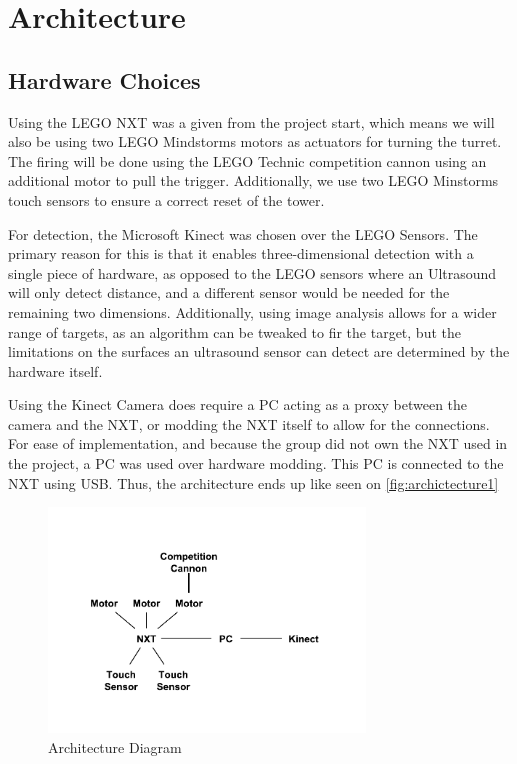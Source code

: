 \section{Architecture}

\subsection{Hardware Choices}

Using the LEGO NXT was a given from the project start, which means we will also be using two LEGO Mindstorms
motors as actuators for turning the turret. The firing will be done using the LEGO Technic competition cannon
using an additional motor to pull the trigger. Additionally, we use two LEGO Minstorms touch sensors to ensure
a correct reset of the tower.

For detection, the Microsoft Kinect was chosen over the LEGO Sensors. The primary reason for this is that
it enables three-dimensional detection with a single piece of hardware, as opposed to the LEGO sensors where
an Ultrasound will only detect distance, and a different sensor would be needed for the remaining two dimensions.
Additionally, using image analysis allows for a wider range of targets, as an algorithm can be tweaked to
fir the target, but the limitations on the surfaces an ultrasound sensor can detect are determined by the
hardware itself.

Using the Kinect Camera does require a PC acting as a proxy between the camera and the NXT, or modding the
NXT itself to allow for the connections. For ease of implementation, and because the group did not own the NXT
used in the project, a PC was used over hardware modding. This PC is connected to the NXT using USB.
Thus, the architecture ends up like seen on \autoref{fig:archictecture1}

\begin{figure}[hbtp]
\includegraphics[width=0.75\textwidth]{img/architecture1.pdf}
\caption{Architecture Diagram} 
\label{fig:archictecture1} 
\end{figure}

